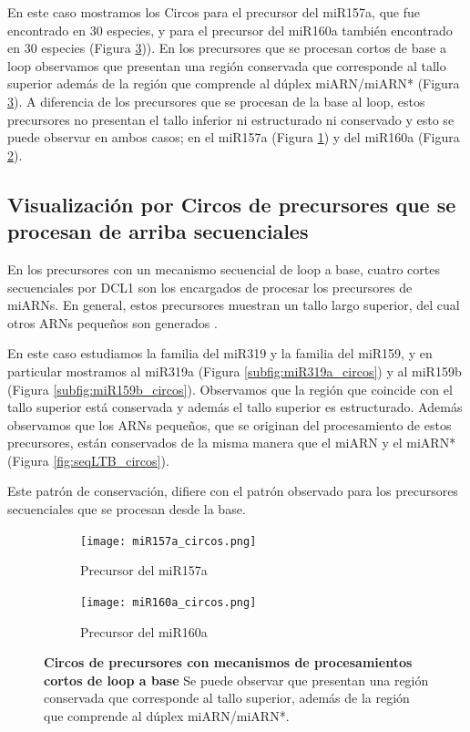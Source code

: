 En este caso mostramos los Circos para el precursor del miR157a, que fue encontrado en 30 especies, y para el precursor del miR160a también encontrado en 30 especies (Figura \ref{fig:srLTB_circos})). 
En los precursores que se procesan cortos de base a loop observamos que presentan una región conservada que corresponde al tallo superior además de la región que comprende al dúplex miARN/miARN* (Figura \ref{fig:srLTB_circos}).
A diferencia de los precursores que se procesan de la base al loop, estos precursores no presentan el tallo inferior ni estructurado ni conservado y esto se puede observar en ambos casos; en el miR157a (Figura \ref{subfig:miR157a_circos}) y del miR160a (Figura \ref{subfig:miR160a_circos}).


\subsection{Visualización por Circos de precursores que se procesan de arriba secuenciales}

En los precursores con un mecanismo secuencial de loop a base, cuatro cortes secuenciales por DCL1 son los encargados de procesar los precursores de miARNs.
En general, estos precursores muestran un tallo largo superior, del cual otros ARNs pequeños son generados \citep{pmid19850910,Bologna2009,Bologna2013}.

En este caso estudiamos la familia del miR319 y la familia del miR159, y en particular mostramos al miR319a (Figura \ref{subfig:miR319a_circos}) y al miR159b (Figura \ref{subfig:miR159b_circos}).
Observamos que la región que coincide con el tallo superior está conservada y además el tallo superior es estructurado.
Además observamos que los ARNs pequeños, que se originan del procesamiento de estos precursores, están conservados de la misma manera que el miARN y el miARN* (Figura \ref{fig:seqLTB_circos}).

Este patrón de conservación, difiere con el patrón observado para los precursores secuenciales que se procesan desde la base.

\begin{landscape}
	\begin{figure}
	\centering
	\begin{subfigure}{.75\textwidth}
 \centering
 \texttt{[image: miR157a\_circos.png]}
 \caption{Precursor del miR157a}
 \label{subfig:miR157a_circos}
	\end{subfigure}%
	\begin{subfigure}{.75\textwidth}
 \centering
 \texttt{[image: miR160a\_circos.png]}
 \caption{Precursor del miR160a}
 \label{subfig:miR160a_circos}
	\end{subfigure}
      \caption[Circos de precursores con mecanismos de procesamientos cortos de loop a base]{
        \textbf{Circos de precursores con mecanismos de procesamientos cortos de loop a base}
        Se puede observar que presentan una región conservada que corresponde al tallo superior, además de la región que comprende al dúplex miARN/miARN*.
        }

	\label{fig:srLTB_circos}
	\end{figure}
\end{landscape}


